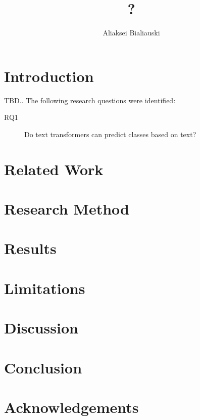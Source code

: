 \documentclass[sigplan,nonacm,review]{acmart}
\title{?}
\author{Aliaksei Bialiauski}
\affiliation{
    \institution{?}
    \city{Minsk}
    \country{Belarus}
}
\begin{document}
    \maketitle


    \section{Introduction}\label{sec:introduction}
    TBD..
    The following research questions were identified:
    \begin{description}
        \item[RQ1] Do text transformers can predict classes based on text?
    \end{description}


    \section{Related Work}\label{sec:related}


    \section{Research Method}\label{sec:method}


    \section{Results}\label{sec:results}


    \section{Limitations}\label{sec:limitations}


    \section{Discussion}\label{sec:discussion}


    \section{Conclusion}\label{sec:conclusion}


    \section{Acknowledgements}\label{sec:acks}

    
    \cite{testCitation}
    
\end{document}
